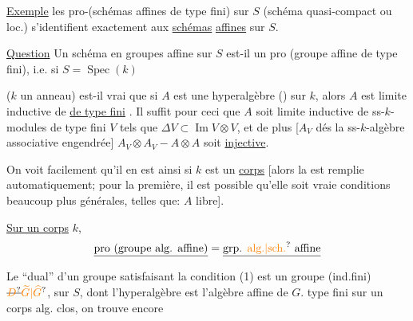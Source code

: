 \uline{Exemple} les pro-(schémas affines de type fini) sur $S$  (schéma quasi-compact ou  loc.) s'identifient exactement aux \uline{schémas} \uline{affines} sur $S$.

\uline{Question}  Un schéma en groupes affine sur $S$ est-il un pro (groupe affine de type fini), i.e. si $S=\operatorname{Spec}(k)$

($k$ un anneau) est-il vrai que si $A$ est une hyperalgèbre () sur $k$, alors $A$  est limite inductive de  \uline{de type fini} . Il suffit pour ceci que $A$ soit limite inductive de ss-$k$-modules de type fini $V$ tels que $\Delta V\subset\operatorname{Im}V\otimes V$, et de plus [$A_V$ dés la ss-$k$-algèbre associative engendrée]  $A_V\otimes A_V\mathbin{-}A\otimes A$ soit \uline{injective}. 

On voit facilement qu'il en est ainsi si $k$ est un \uline{corps} [alors la   est remplie automatiquement; pour la première, il est possible qu'elle soit vraie   conditions beaucoup plus générales, telles que: $A$ libre].
\margin{$\unsure{\ast|+}$}

\uline{Sur un corps} $k$, 
\[
\underline{\text{pro (groupe alg. affine)}}=\underline{\text{grp. \unsure{alg.|sch.} affine}}
\]

Le ``dual'' d'un  groupe  satisfaisant la condition (1) est un groupe (ind.fini) $\deleted{\unsure{D}}\unsure{\widetilde G|\widehat G}$, sur $S$, dont l'hyperalgèbre est l'algèbre affine de $G$.  type fini sur un corps alg. clos, on trouve encore

